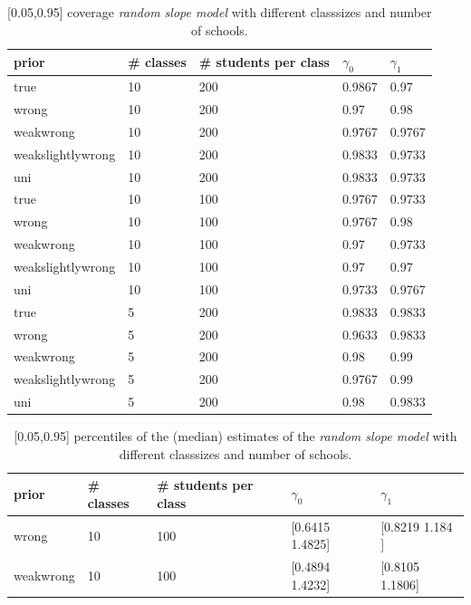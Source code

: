 \begin{table}[!ht]
\begin{center}
\begin{tabular}{l l l l  l}
prior & \# classes & \#  students per class &  $\gamma_0$ & $ \gamma_1$ \\
\hline
\hline
true & 10  &  200  &  0.9867  &  0.97\\
wrong & 10  &  200  &  0.97  &  0.98\\
weakwrong & 10  &  200  &  0.9767  &  0.9767\\
weakslightlywrong & 10  &  200  &  0.9833  &  0.9733\\
uni & 10  &  200  &  0.9833  &  0.9733\\
\hline
true &10  &  100  &  0.9767  &  0.9733\\
wrong & 10  &  100  &  0.9767  &  0.98\\
weakwrong & 10  &  100  &  0.97  &  0.9733 \\
weakslightlywrong &10  &  100  &  0.97  &  0.97\\
uni &10  &  100  &  0.9733  &  0.9767\\ 
\hline
true & 5  &  200  &  0.9833  &  0.9833\\
wrong & 5  &  200  &  0.9633  &  0.9833\\
weakwrong & 5  &  200  &  0.98  &  0.99\\
weakslightlywrong &5  &  200  &  0.9767  &  0.99\\
uni &5  &  200  &  0.98  &  0.9833\\
\end{tabular}
\end{center}
\caption{[0.05,0.95] coverage \emph{random slope model}  with different classsizes and number of schools. }
\label{tab:coverage}
\end{table}


\begin{table}[!ht]
\begin{center}
\begin{tabular}{l l l l  l}
prior & \# classes & \#  students per class &  $\gamma_0$ & $ \gamma_1$ \\
\hline
wrong &10  &  100  &  [0.6415 1.4825]  &  [0.8219 1.184 ]\\
weakwrong & 10  &  100  &  [0.4894 1.4232]  &  [0.8105 1.1806]\\
\hline
\end{tabular}
\end{center}
\caption{ [0.05,0.95] percentiles of the (median) estimates of the  \emph{random slope model}  with different classsizes and number of schools. }
\label{tab:median}
\end{table}
